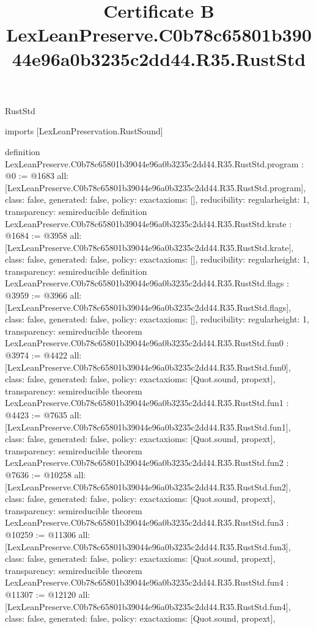 \begin{lexlean}{RustStd}
\title{Certificate B LexLeanPreserve.C0b78c65801b39044e96a0b3235c2dd44.R35.RustStd}
\begin{coremodule}
imports [LexLeanPreservation.RustSound]

definition LexLeanPreserve.C0b78c65801b39044e96a0b3235c2dd44.R35.RustStd.program : @0 := @1683 {
  all: [LexLeanPreserve.C0b78c65801b39044e96a0b3235c2dd44.R35.RustStd.program],
  class: false,
  generated: false,
  policy: exact{axioms: []},
  reducibility: regular{height: 1},
  transparency: semireducible
}
definition LexLeanPreserve.C0b78c65801b39044e96a0b3235c2dd44.R35.RustStd.krate : @1684 := @3958 {
  all: [LexLeanPreserve.C0b78c65801b39044e96a0b3235c2dd44.R35.RustStd.krate],
  class: false,
  generated: false,
  policy: exact{axioms: []},
  reducibility: regular{height: 1},
  transparency: semireducible
}
definition LexLeanPreserve.C0b78c65801b39044e96a0b3235c2dd44.R35.RustStd.flags : @3959 := @3966 {
  all: [LexLeanPreserve.C0b78c65801b39044e96a0b3235c2dd44.R35.RustStd.flags],
  class: false,
  generated: false,
  policy: exact{axioms: []},
  reducibility: regular{height: 1},
  transparency: semireducible
}
theorem LexLeanPreserve.C0b78c65801b39044e96a0b3235c2dd44.R35.RustStd.fun0 : @3974 := @4422 {
  all: [LexLeanPreserve.C0b78c65801b39044e96a0b3235c2dd44.R35.RustStd.fun0],
  class: false,
  generated: false,
  policy: exact{axioms: [Quot.sound, propext]},
  transparency: semireducible
}
theorem LexLeanPreserve.C0b78c65801b39044e96a0b3235c2dd44.R35.RustStd.fun1 : @4423 := @7635 {
  all: [LexLeanPreserve.C0b78c65801b39044e96a0b3235c2dd44.R35.RustStd.fun1],
  class: false,
  generated: false,
  policy: exact{axioms: [Quot.sound, propext]},
  transparency: semireducible
}
theorem LexLeanPreserve.C0b78c65801b39044e96a0b3235c2dd44.R35.RustStd.fun2 : @7636 := @10258 {
  all: [LexLeanPreserve.C0b78c65801b39044e96a0b3235c2dd44.R35.RustStd.fun2],
  class: false,
  generated: false,
  policy: exact{axioms: [Quot.sound, propext]},
  transparency: semireducible
}
theorem LexLeanPreserve.C0b78c65801b39044e96a0b3235c2dd44.R35.RustStd.fun3 : @10259 := @11306 {
  all: [LexLeanPreserve.C0b78c65801b39044e96a0b3235c2dd44.R35.RustStd.fun3],
  class: false,
  generated: false,
  policy: exact{axioms: [Quot.sound, propext]},
  transparency: semireducible
}
theorem LexLeanPreserve.C0b78c65801b39044e96a0b3235c2dd44.R35.RustStd.fun4 : @11307 := @12120 {
  all: [LexLeanPreserve.C0b78c65801b39044e96a0b3235c2dd44.R35.RustStd.fun4],
  class: false,
  generated: false,
  policy: exact{axioms: [Quot.sound, propext]},
}
\end{coremodule}
\end{lexlean}
